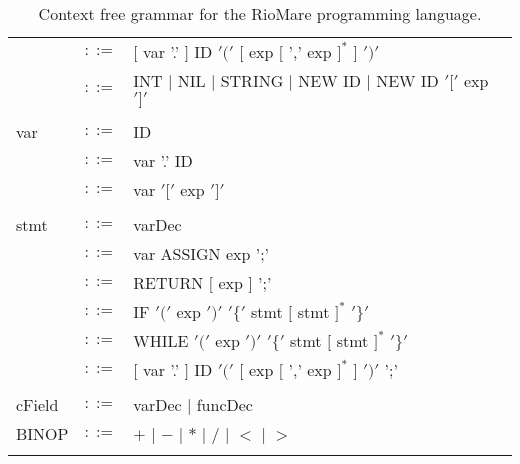 \documentclass{article}
\begin{document}
\begin{table}[h]
\begin{tabular}{ l c l }
         & $::=$ & $[$ var '.' $]$ ID $'('$ $[$ exp $[$ ',' exp $]^{*}$ $]$ $')'$ \\
         & $::=$ & INT $|$ NIL $|$ STRING $|$ NEW ID $|$ NEW ID $'['$ exp $']'$   \\
\\
var      & $::=$ & ID                  \\
         & $::=$ & var '.' ID          \\
         & $::=$ & var $'['$ exp $']'$ \\
\\  
stmt     & $::=$ & varDec                                                             \\
         & $::=$ & var ASSIGN exp ';'                                                 \\
         & $::=$ & RETURN $[$ exp $]$ ';'                                             \\
         & $::=$ & IF $'('$ exp $')'$ $'\{'$ stmt $[$ stmt $]^{*}$ $'\}'$             \\
         & $::=$ & WHILE $'('$ exp $')'$ $'\{'$ stmt $[$ stmt $]^{*}$ $'\}'$          \\
         & $::=$ & $[$ var '.' $]$ ID $'('$ $[$ exp $[$ ',' exp $]^{*}$ $]$ $')'$ ';' \\
\\
cField   & $::=$ & varDec $|$ funcDec \\
BINOP    & $::=$ & $+$ $|$ $-$ $|$ $*$ $|$ $/$ $|$ $<$ $|$ $>$ \\
\\
\end{tabular}
\caption{
Context free grammar for the RioMare programming language.
\label{Table_CFG_Of_RioMare}}
\end{table}
\end{document}
